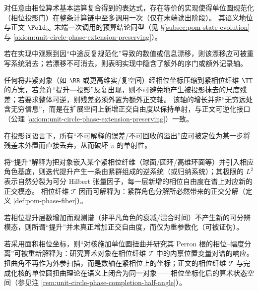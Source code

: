 \begin{corollary}[相位投影门的常数预算]\label{cor:phase-projection-gate-budget}
对任意由相位算术基本运算复合得到的表达式，存在等价的实现使得单位圆规范化（相位投影门）在整条计算链中至多调用一次（仅在末端读出阶段）。
其语义地位与正文 \(\Fold_\infty\) 末端一次调用的预算结论同型（见 \S\ref{subsec:pom-state-evolution} 与 \ref{axiom:unit-circle-phase-extension-preserving}）。
\end{corollary}
\begin{remark}[可检验含义]
若在实现中观察到因“中途反复规范化”导致的数值或信息漂移，则该漂移应可被重写系统消去；若漂移不可消去，则表明实现中隐含了额外的序门或额外记录轴。
\end{remark}

\begin{proposition}[相位压缩的可逆化与残差轴外置]\label{prop:phase-residual-axis}
任何将非紧对象（如 \(\RR\) 或更高维实/复空间）经相位坐标压缩到紧相位纤维 \(\TT\) 的方案，若允许“提升—投影”反复出现，则不可避免地产生被投影抹去的尺度残差；若要求整体可逆，则残差必须外置为额外正交轴。
该轴的增长并非“无穷远处含无穷信息”，而是在扩展空间上新增正交自由度以保持单射，与正文可逆化接口（公理 \ref{axiom:unit-circle-phase-extension-preserving}）一致。
\end{proposition}
\begin{remark}[可检验含义]
在投影词语言下，所有“不可解释的误差/不可回收的溢出”应可被定位为某一步将残差未外置而直接丢弃，从而破坏 \(\widetilde\pi\) 的单射性。
\end{remark}

\begin{proposition}[紧相位塔与极限表示]\label{prop:compact-phase-tower}
将“提升”解释为把对象嵌入某个紧相位纤维（球面/圆环/高维环面等）并引入相应角色基底，则迭代提升产生一条由紧群组成的逆系统（或归纳系统）；其极限的 \(L^{2}\) 表示自然分裂为可分 Hilbert 张量因子，每一层新增的相位自由度在谱上对应新的正交模态。
相位纤维 \(\mathcal{T}\) 因而可解释为：紧群角色分解所必然带来的正交分解（定义 \ref{def:pom-phase-fiber}）。
\end{proposition}
\begin{remark}[可检验含义]
若相位提升层数增加而观测谱（非平凡角色的衰减/混合时间）不产生新的可分辨模态，则所谓“提升”并未真正增加正交自由度，而仅为重参数化（可被证伪）。
\end{remark}

\begin{proposition}[内禀扭曲原理]\label{prop:phase-intrinsic-twist}
若采用面积相位坐标，则“对核施加单位圆扭曲并研究其 Perron 根的相位–幅度分离”可被重新解释为：研究算术对象在相位纤维 \(\mathcal{T}\) 中的内禀位置变量对谱的响应。
扭曲角不再作为外参扫描，而是数轴在紧相位上的坐标；正文的相位纤维 \(\mathcal{T}\) 与完成化核的单位圆扭曲理论在语义上闭合为同一对象——相位坐标化后的算术状态空间（参见注 \ref{rem:unit-circle-phase-completion-half-angle}）。
\end{proposition}

